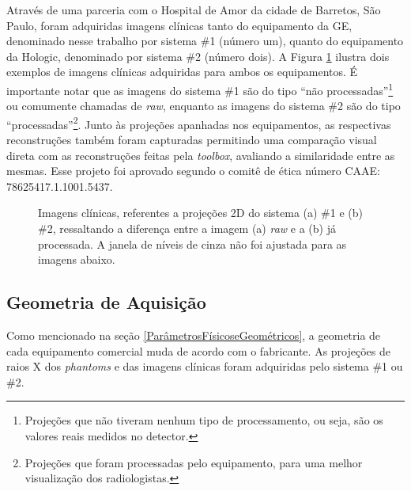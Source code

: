 Através de uma parceria com o Hospital de Amor da cidade de Barretos, São Paulo, foram adquiridas imagens clínicas tanto do equipamento da \acs{GE}, denominado nesse trabalho por sistema \#1 (número um), quanto do equipamento da Hologic, denominado por sistema \#2 (número dois). A Figura \ref{fig:imgCap4ProjsDBT} ilustra dois exemplos de imagens clínicas adquiridas para ambos os equipamentos. É importante notar que as imagens do sistema \#1 são do tipo ``não processadas''\footnote{Projeções que não tiveram nenhum tipo de processamento, ou seja, são os valores reais medidos no detector.} ou comumente chamadas de \textit{raw}, enquanto as imagens do sistema \#2 são do tipo ``processadas''\footnote{Projeções que foram processadas pelo equipamento, para uma melhor visualização dos radiologistas.}. Junto às projeções apanhadas nos equipamentos, as respectivas reconstruções também foram capturadas permitindo uma comparação visual direta com as reconstruções feitas pela \textit{toolbox}, avaliando a similaridade entre as mesmas. Esse projeto foi aprovado segundo o comitê de ética número CAAE: 78625417.1.1001.5437.

\begin{figure}[htb]
	\centering
	
	\caption{Imagens clínicas, referentes a projeções \acs{2D} do sistema (a) \#1 e (b) \#2, ressaltando a diferença entre a imagem (a) \textit{raw} e a (b) já processada. A janela de níveis de cinza não foi ajustada para as imagens abaixo.}
	
	\hfil
	\hfil
	
	\label{fig:imgCap4ProjsDBT}
\end{figure}

\subsection{Geometria de Aquisição} 


Como mencionado na seção \ref{ParâmetrosFísicoseGeométricos}, a geometria de cada equipamento comercial muda de acordo com o fabricante. As projeções de raios X dos \textit{phantoms} e das imagens clínicas foram adquiridas pelo sistema \#1 ou \#2. 

